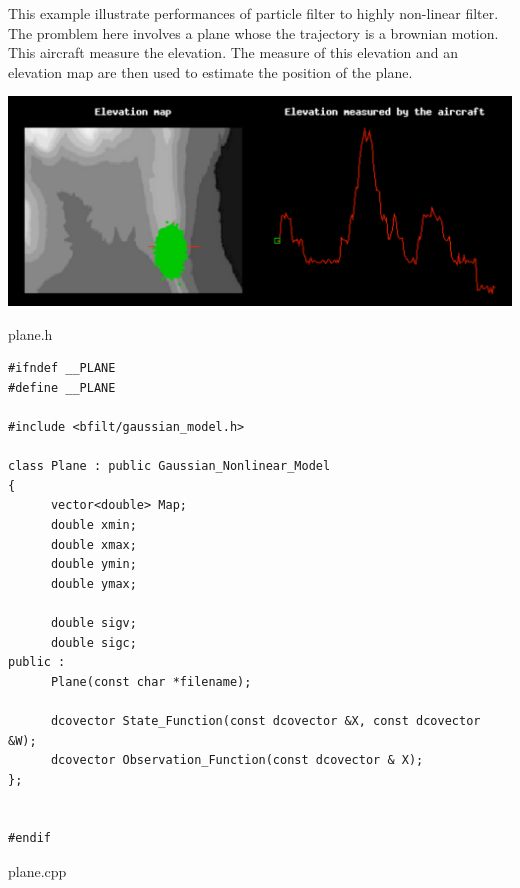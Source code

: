 This example illustrate performances of particle filter to highly non-linear filter. The promblem here involves a plane whose the trajectory is a brownian motion. This aircraft measure the elevation. The measure of this elevation and an elevation map are then used to estimate the position of the plane.  \begin{ImageNoCaption}\mbox{\includegraphics{plane}}
\end{ImageNoCaption}


plane.h 

\begin{DocInclude}\begin{verbatim}#ifndef __PLANE
#define __PLANE

#include <bfilt/gaussian_model.h>

class Plane : public Gaussian_Nonlinear_Model
{
      vector<double> Map;
      double xmin;
      double xmax;
      double ymin;
      double ymax;

      double sigv;
      double sigc;
public :
      Plane(const char *filename);

      dcovector State_Function(const dcovector &X, const dcovector &W);
      dcovector Observation_Function(const dcovector & X);
};


#endif
\end{verbatim}
\end{DocInclude}
 plane.cpp 

